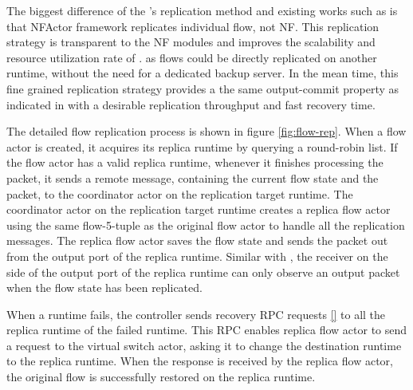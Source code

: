 The biggest difference of the \nfactor's replication method and existing works such as \cite{sherry2015rollback} is that NFActor framework replicates individual flow, not NF. This replication strategy is transparent to the NF modules and improves the scalability and resource utilization rate of \nfactor. as flows could be directly replicated on another runtime, without the need for a dedicated backup server. In the mean time, this fine grained replication strategy provides a the same output-commit property as indicated in \cite{sherry2015rollback} with a desirable replication throughput and fast recovery time.

The detailed flow replication process is shown in figure \ref{fig:flow-rep}. When a flow actor is created, it acquires its replica runtime by querying a round-robin list. If the flow actor has a valid replica runtime, whenever it finishes processing the packet, it sends a remote message, containing the current flow state and the packet, to the coordinator actor on the replication target runtime. The coordinator actor on the replication target runtime creates a replica flow actor using the same flow-5-tuple as the original flow actor to handle all the replication messages. The replica flow actor saves the flow state and sends the packet out from the output port of the replica runtime. Similar with \cite{sherry2015rollback}, the receiver on the side of the output port of the replica runtime can only observe an output packet when the flow state has been replicated.

When a runtime fails, the controller sends recovery RPC requests \ref{} to all the replica runtime of the failed runtime. This RPC enables replica flow actor to send a request to the virtual switch actor, asking it to change the destination runtime to the replica runtime. When the response is received by the replica flow actor, the original flow is successfully restored on the replica runtime.
